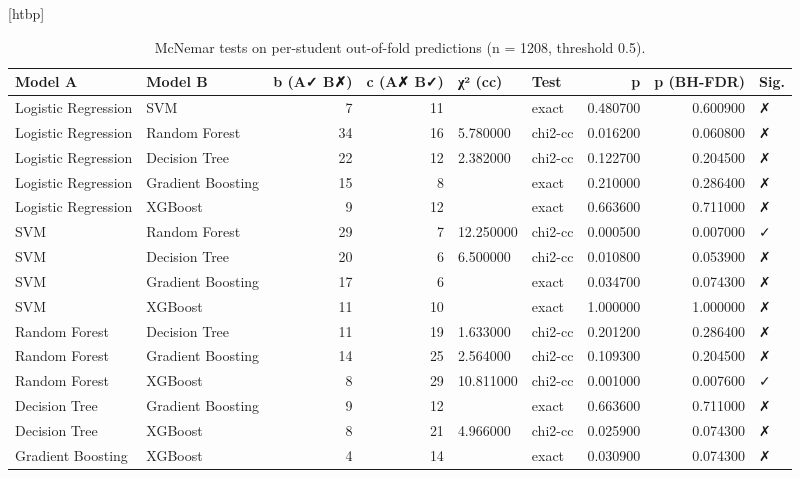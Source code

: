 \begin{table}
\small[htbp]
\caption{McNemar tests on per-student out-of-fold predictions (n = 1208, threshold 0.5).}
\label{tab:P06_mcnemar_oof}
\begin{tabular}{llrrllrrl}
\toprule
Model A & Model B & b (A✓ B✗) & c (A✗ B✓) & χ² (cc) & Test & p & p (BH-FDR) & Sig. \\
\midrule
Logistic Regression & SVM & 7 & 11 &  & exact & 0.480700 & 0.600900 & ✗ \\
Logistic Regression & Random Forest & 34 & 16 & 5.780000 & chi2-cc & 0.016200 & 0.060800 & ✗ \\
Logistic Regression & Decision Tree & 22 & 12 & 2.382000 & chi2-cc & 0.122700 & 0.204500 & ✗ \\
Logistic Regression & Gradient Boosting & 15 & 8 &  & exact & 0.210000 & 0.286400 & ✗ \\
Logistic Regression & XGBoost & 9 & 12 &  & exact & 0.663600 & 0.711000 & ✗ \\
SVM & Random Forest & 29 & 7 & 12.250000 & chi2-cc & 0.000500 & 0.007000 & ✓ \\
SVM & Decision Tree & 20 & 6 & 6.500000 & chi2-cc & 0.010800 & 0.053900 & ✗ \\
SVM & Gradient Boosting & 17 & 6 &  & exact & 0.034700 & 0.074300 & ✗ \\
SVM & XGBoost & 11 & 10 &  & exact & 1.000000 & 1.000000 & ✗ \\
Random Forest & Decision Tree & 11 & 19 & 1.633000 & chi2-cc & 0.201200 & 0.286400 & ✗ \\
Random Forest & Gradient Boosting & 14 & 25 & 2.564000 & chi2-cc & 0.109300 & 0.204500 & ✗ \\
Random Forest & XGBoost & 8 & 29 & 10.811000 & chi2-cc & 0.001000 & 0.007600 & ✓ \\
Decision Tree & Gradient Boosting & 9 & 12 &  & exact & 0.663600 & 0.711000 & ✗ \\
Decision Tree & XGBoost & 8 & 21 & 4.966000 & chi2-cc & 0.025900 & 0.074300 & ✗ \\
Gradient Boosting & XGBoost & 4 & 14 &  & exact & 0.030900 & 0.074300 & ✗ \\
\bottomrule
\end{tabular}
\end{table}
